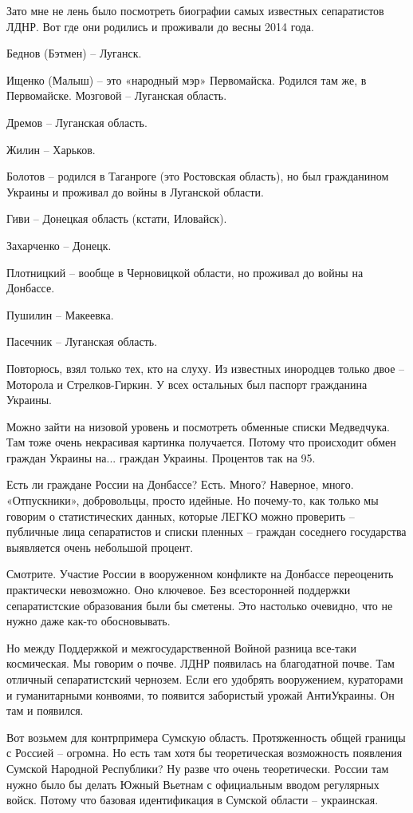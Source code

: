 Зато мне не лень было посмотреть биографии самых известных сепаратистов ЛДНР.
Вот где они родились и проживали до весны 2014 года.

Беднов (Бэтмен) – Луганск. 

Ищенко (Малыш) – это «народный мэр» Первомайска. Родился там же, в Первомайске.
Мозговой – Луганская область. 

Дремов – Луганская область. 

Жилин – Харьков. 

Болотов – родился в Таганроге (это Ростовская область), но был гражданином
Украины и проживал до войны в Луганской области. 

Гиви – Донецкая область (кстати, Иловайск).

Захарченко – Донецк.

Плотницкий – вообще в Черновицкой области, но проживал до войны на Донбассе.

Пушилин – Макеевка.

Пасечник – Луганская область.

Повторюсь, взял только тех, кто на слуху. Из известных инородцев только двое –
Моторола и Стрелков-Гиркин. У всех остальных был паспорт гражданина Украины.

Можно зайти на низовой уровень и посмотреть обменные списки Медведчука. Там
тоже очень некрасивая картинка получается. Потому что происходит обмен граждан
Украины на... граждан Украины. Процентов так на 95.

Есть ли граждане России на Донбассе? Есть. Много? Наверное, много.
«Отпускники», добровольцы, просто идейные. Но почему-то, как только мы говорим
о статистических данных, которые ЛЕГКО можно проверить – публичные лица
сепаратистов и списки пленных – граждан соседнего государства выявляется очень
небольшой процент.

Смотрите. Участие России в вооруженном конфликте на Донбассе переоценить
практически невозможно. Оно ключевое. Без всесторонней поддержки сепаратистские
образования были бы сметены. Это настолько очевидно, что не нужно даже как-то
обосновывать.

Но между Поддержкой и межгосударственной Войной разница все-таки космическая.
Мы говорим о почве. ЛДНР появилась на благодатной почве. Там отличный
сепаратистский чернозем. Если его удобрять вооружением, кураторами и
гуманитарными конвоями, то появится забористый урожай АнтиУкраины. Он там и
появился.

Вот возьмем для контрпримера Сумскую область. Протяженность общей границы с
Россией – огромна. Но есть там хотя бы теоретическая возможность появления
Сумской Народной Республики? Ну разве что очень теоретически. России там нужно
было бы делать Южный Вьетнам с официальным вводом регулярных войск. Потому что
базовая идентификация в Сумской области – украинская.

